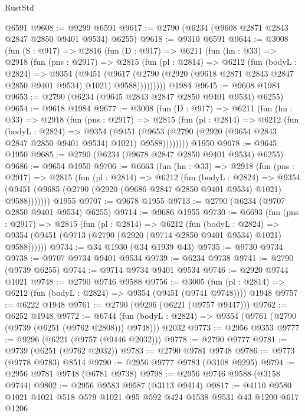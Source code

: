 \begin{lexlean}{RustStd}
\begin{coremodule}
    @6591
@9608 := @9299 @6591
@9617 := @2790 (@6234 (@9608 @2871 @2843 @2847 @2850 @9401 @9534) @6255)
@9618 := @9310 @6591
@9644 := @3008
    (fun (S : @917) =>
    @2816
      (fun (D : @917) =>
      @6211
        (fun (hn : @33) =>
        @2918
          (fun (pns : @2917) =>
          @2815
            (fun (pl : @2814) =>
            @6212
              (fun (bodyL : @2824) =>
              @9354
                (@9451
                  (@9617
                    (@2790 (@2920 (@9618 @2871 @2843 @2847 @2850 @9401 @9534) @1021) @9588)))))))))
    @1984
@9645 := @9608 @1984
@9653 := @2790 (@6234 (@9645 @2843 @2847 @2850 @9401 @9534) @6255)
@9654 := @9618 @1984
@9677 := @3008
    (fun (D : @917) =>
    @6211
      (fun (hn : @33) =>
      @2918
        (fun (pns : @2917) =>
        @2815
          (fun (pl : @2814) =>
          @6212
            (fun (bodyL : @2824) =>
            @9354
              (@9451 (@9653 (@2790 (@2920 (@9654 @2843 @2847 @2850 @9401 @9534) @1021) @9588))))))))
    @1950
@9678 := @9645 @1950
@9685 := @2790 (@6234 (@9678 @2847 @2850 @9401 @9534) @6255)
@9686 := @9654 @1950
@9706 := @6663
    (fun (hn : @33) =>
    @2918
      (fun (pns : @2917) =>
      @2815
        (fun (pl : @2814) =>
        @6212
          (fun (bodyL : @2824) =>
          @9354 (@9451 (@9685 (@2790 (@2920 (@9686 @2847 @2850 @9401 @9534) @1021) @9588)))))))
    @1955
@9707 := @9678 @1955
@9713 := @2790 (@6234 (@9707 @2850 @9401 @9534) @6255)
@9714 := @9686 @1955
@9730 := @6693
    (fun (pns : @2917) =>
    @2815
      (fun (pl : @2814) =>
      @6212
        (fun (bodyL : @2824) =>
        @9354 (@9451 (@9713 (@2790 (@2920 (@9714 @2850 @9401 @9534) @1021) @9588))))))
@9734 := @34 @1930 (@34 @1939 @43)
@9735 := @9730 @9734
@9738 := @9707 @9734 @9401 @9534
@9739 := @6234 @9738
@9741 := @2790 (@9739 @6255)
@9744 := @9714 @9734 @9401 @9534
@9746 := @2920 @9744 @1021
@9748 := @2790 @9746 @9588
@9756 := @3005
    (fun (pl : @2814) => @6212 (fun (bodyL : @2824) => @9354 (@9451 (@9741 @9748))))
    @1948
@9757 := @6222 @1948
@9761 := @2790 (@9296 (@6221 (@9757 @9447)))
@9762 := @6252 @1948
@9772 := @6744
    (fun (bodyL : @2824) => @9354 (@9761 (@2790 (@9739 (@6251 (@9762 @2808))) @9748)))
    @2032
@9773 := @2956 @9353
@9777 := @9296 (@6221 (@9757 (@9446 @2032)))
@9778 := @2790 @9777
@9781 := @9739 (@6251 (@9762 @2032))
@9783 := @2790 @9781 @9748
@9786 := @9773 (@9778 @9783) @8514
@9790 := @2956 @9777 @9783 (@3108 @9295)
@9794 := @2956 @9781 @9748 (@6781 @9738)
@9798 := @2956 @9746 @9588 (@3158 @9744)
@9802 := @2956 @9583 @9587 (@3113 @9414)
@9817 := @4110 @9580 @1021 @1021 @518 @579 @1021 @95 @592 @424 @1538 @9531 @43 @1200 @617 @1206

\end{coremodule}
\end{lexlean}
